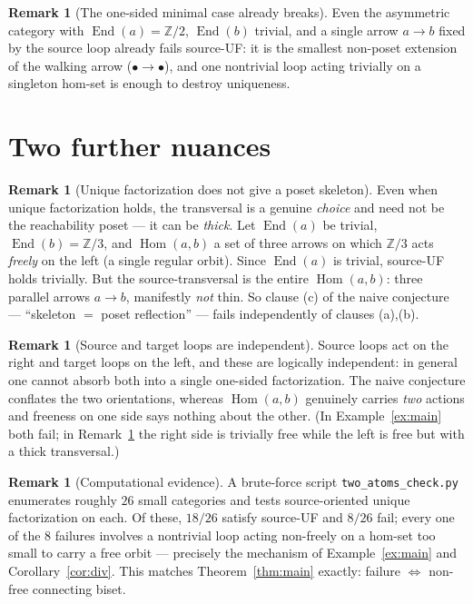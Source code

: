 \documentclass[11pt]{article}
\theoremstyle{definition}
\newtheorem{remark}[theorem]{Remark}
\newcommand{\Hom}{\operatorname{Hom}}
\newcommand{\End}{\operatorname{End}}
\newcommand{\Z}{\mathbb{Z}}
\begin{document}
\begin{remark}[The one-sided minimal case already breaks]
Even the asymmetric category with $\End(a) = \Z/2$, $\End(b)$ trivial, and a
single arrow $a \to b$ fixed by the source loop already fails source-UF: it is
the smallest non-poset extension of the walking arrow ($\bullet \to \bullet$),
and one nontrivial loop acting trivially on a singleton hom-set is enough to
destroy uniqueness.
\end{remark}

\section{Two further nuances}

\begin{remark}[Unique factorization does not give a poset skeleton]\label{rem:thick}
Even when unique factorization holds, the transversal is a genuine \emph{choice}
and need not be the reachability poset --- it can be \emph{thick}. Let $\End(a)$
be trivial, $\End(b) = \Z/3$, and $\Hom(a,b)$ a set of three arrows on which
$\Z/3$ acts \emph{freely} on the left (a single regular orbit). Since $\End(a)$
is trivial, source-UF holds trivially. But the source-transversal is the entire
$\Hom(a,b)$: three parallel arrows $a \to b$, manifestly \emph{not} thin. So
clause (c) of the naive conjecture --- ``skeleton $=$ poset reflection'' ---
fails independently of clauses (a),(b).
\end{remark}

\begin{remark}[Source and target loops are independent]
Source loops act on the right and target loops on the left, and these are
logically independent: in general one cannot absorb both into a single
one-sided factorization. The naive conjecture conflates the two orientations,
whereas $\Hom(a,b)$ genuinely carries \emph{two} actions and freeness on one
side says nothing about the other. (In Example~\ref{ex:main} both fail; in
Remark~\ref{rem:thick} the right side is trivially free while the left is free
but with a thick transversal.)
\end{remark}

\begin{remark}[Computational evidence]
A brute-force script \texttt{two\_atoms\_check.py} enumerates roughly $26$ small
categories and tests source-oriented unique factorization on each. Of these,
$18/26$ satisfy source-UF and $8/26$ fail; every one of the $8$ failures
involves a nontrivial loop acting non-freely on a hom-set too small to carry a
free orbit --- precisely the mechanism of Example~\ref{ex:main} and
Corollary~\ref{cor:div}. This matches Theorem~\ref{thm:main} exactly: failure
$\iff$ non-free connecting biset.
\end{remark}
\end{document}
